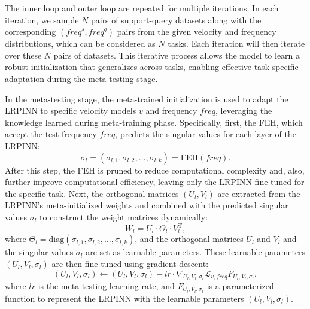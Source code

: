 The inner loop and outer loop are repeated for multiple iterations. In each iteration, we sample $N$ pairs of support-query datasets along with the corresponding $(\textit{freq}^s, \textit{freq}^q)$ pairs from the given velocity and frequency distributions, which can be considered as $N$ tasks. Each iteration will then iterate over these $N$ pairs of datasets. This iterative process allows the model to learn a robust initialization that generalizes across tasks, enabling effective task-specific adaptation during the meta-testing stage. 

In the meta-testing stage, the meta-trained initialization is used to adapt the LRPINN to specific velocity models $v$ and frequency $\textit{freq}$, leveraging the knowledge learned during meta-training phase. Specifically, first, the FEH, which accept the test frequency $\textit{freq}$, predicts the singular values for each layer of the LRPINN: 
\begin{equation} \label{eq14}
\sigma_l = (\sigma_{l,1}, \sigma_{l,2}, \dots, \sigma_{l,k}) = \text{FEH}(\textit{freq}). 
\end{equation} 
After this step, the FEH is pruned to reduce computational complexity and, also, further improve computational efficiency, leaving only the LRPINN fine-tuned for the specific task. Next, the orthogonal matrices $(U_l, V_l)$ are extracted from the LRPINN’s meta-initialized weights and combined with the predicted singular values $\sigma_l$ to construct the weight matrices dynamically: 
\begin{equation}\label{eq15}
W_l = U_l \cdot \Theta_l \cdot V_l^\text{T}, 
\end{equation} 
where $\Theta_l = \text{diag}(\sigma_{l,1}, \sigma_{l,2}, \dots, \sigma_{l,k})$, and the orthogonal matrices $U_l$ and $V_l$ and the singular values $\sigma_l$ are set as learnable parameters. These learnable parameters $(U_l, V_l, \sigma_l)$ are then fine-tuned using gradient descent: 
\begin{equation}\label{eq16}
(U_l, V_l, \sigma_l) \leftarrow (U_l, V_l, \sigma_l) - lr \cdot \nabla_{U_l, V_l, \sigma_l} \mathcal{L}_{v, \textit{freq}}F_{U_l, V_l, \sigma_l}, 
\end{equation} 
where $lr$ is the meta-testing learning rate, and $F_{U_l, V_l, \sigma_l}$ is a parameterized function to represent the LRPINN with the learnable parameters $(U_l, V_l, \sigma_l)$. 

